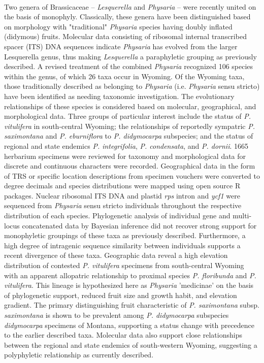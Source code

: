 \paragraph{} Two genera of Brassicaceae – \textit{Lesquerella} and
\textit{Physaria} – were recently united on the basis of monophyly.
Classically, these genera have been distinguished based on morphology with
"traditional" \textit{Physaria} species having doubly inflated (didymous)
fruits.  Molecular data consisting of ribosomal internal transcribed spacer
(ITS) DNA sequences indicate \textit{Physaria} has evolved from the larger
Lesquerella genus, thus making \textit{Lesquerella} a paraphyletic grouping as
previously described. A revised treatment of the combined \textit{Physaria}
recognized 106 species within the genus, of which 26 taxa occur in Wyoming.
Of the Wyoming taxa, those traditionally described as belonging to
\textit{Physaria} (i.e. \textit{Physaria} sensu stricto) have been identified
as needing taxonomic investigation. The evolutionary relationships of these
species is considered based on molecular, geographical, and morphological data.
Three groups of particular interest include the status of \textit{P. vitulifera}
in south-central Wyoming; the relationships of reportedly sympatric
\textit{P. saximontana} and \textit{P. eburniflora} to \textit{P. didymocarpa}
subspecies; and the status of regional and state endemics
\textit{P. integrifolia}, \textit{P. condensata}, and \textit{P. dornii}.
1665 herbarium specimens were reviewed for taxonomy and morphological data for
discrete and continuous characters were recorded. Geographical data in the form
of TRS or specific location descriptions from specimen vouchers were converted
to degree decimals and species distributions were mapped using open source R
packages. Nuclear ribosomal ITS DNA and plastid \textit{rps} intron and
\textit{ycf1} were sequenced from \textit{Physaria} sensu stricto individuals
throughout the respective distribution of each species. Phylogenetic analysis
of individual gene and multi-locus concatenated data by Bayesian inference did
not recover strong support for monophyletic groupings of these taxa as
previously described. Furthermore, a high degree of intragenic sequence
similarity between individuals supports a recent divergence of these taxa.
Geographic data reveal a high elevation distribution of contested
\textit{P. vitulifera} specimens from south-central Wyoming with an apparent
allopatric relationship to proximal species \textit{P. floribunda} and
\textit{P. vitulifera}. This lineage is hypothesized here as \textit{Physaria}
'medicinae' on the basis of phylogenetic support, reduced fruit size and growth
habit, and elevation gradient. The primary distinguishing
fruit characteristic of \textit{P. saximontana} subsp. \textit{saximontana}
is shown to be prevalent among \textit{P. didymocarpa} subspecies
\textit{didymocarpa} specimens of Montana, supporting a status change with
precedence to the earlier described taxa. Molecular data also support close
relationships between the regional and state endemics of south-western Wyoming,
suggesting a polyphyletic relationship as currently described.

